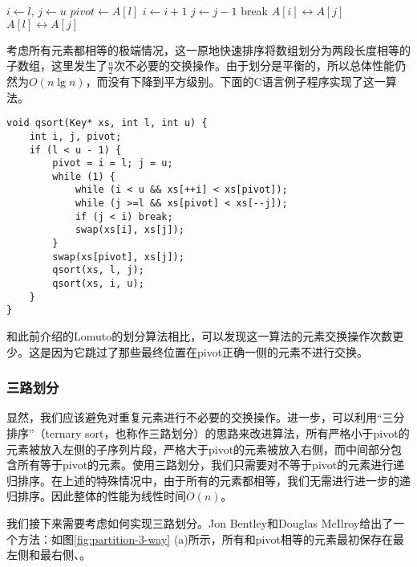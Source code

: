 \documentclass[UTF8]{article}
\begin{document}
\begin{algorithmic}[1]
 \Comment{sort range $[l, u)$}
   
    \State $i \gets l$, $j \gets u$
    \State $pivot \gets A[l]$
    \Loop
      \Repeat
        \State $i \gets i + 1$
       
      \Repeat
        \State $j \gets j - 1$
       
        \State break
      \EndIf
      \State {} $A[i] \leftrightarrow A[j]$
    \EndLoop
    \State {} $A[l] \leftrightarrow A[j]$ 
    \State {}
    \State {}
  \EndIf
\EndProcedure
\end{algorithmic}

考虑所有元素都相等的极端情况，这一原地快速排序将数组划分为两段长度相等的子数组，这里发生了$\frac{n}{2}$次不必要的交换操作。由于划分是平衡的，所以总体性能仍然为$O(n \lg n)$，而没有下降到平方级别。下面的C语言例子程序实现了这一算法。

\lstset{language=C}
\begin{lstlisting}
void qsort(Key* xs, int l, int u) {
    int i, j, pivot;
    if (l < u - 1) {
        pivot = i = l; j = u;
        while (1) {
            while (i < u && xs[++i] < xs[pivot]);
            while (j >=l && xs[pivot] < xs[--j]);
            if (j < i) break;
            swap(xs[i], xs[j]);
        }
        swap(xs[pivot], xs[j]);
        qsort(xs, l, j);
        qsort(xs, i, u);
    }
}
\end{lstlisting}

和此前介绍的Lomuto的划分算法相比，可以发现这一算法的元素交换操作次数更少。这是因为它跳过了那些最终位置在pivot正确一侧的元素不进行交换。

\subsubsection{三路划分}

显然，我们应该避免对重复元素进行不必要的交换操作。进一步，可以利用“三分排序”（ternary sort，也称作三路划分）的思路来改进算法，所有严格小于pivot的元素被放入左侧的子序列片段，严格大于pivot的元素被放入右侧，而中间部分包含所有等于pivot的元素。使用三路划分，我们只需要对不等于pivot的元素进行递归排序。在上述的特殊情况中，由于所有的元素都相等，我们无需进行进一步的递归排序。因此整体的性能为线性时间$O(n)$。

我们接下来需要考虑如何实现三路划分。Jon Bentley和Douglas McIlroy给出了一个方法：如图\ref{fig:partition-3-way} (a)所示，所有和pivot相等的元素最初保存在最左侧和最右侧\cite{3-way-part}、\cite{opt-qs}。
\end{document}
